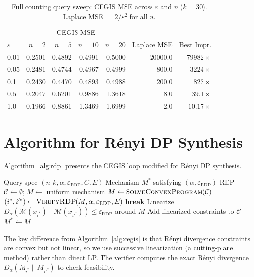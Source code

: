 \documentclass[11pt,a4paper]{article}
\newcommand{\eps}{\varepsilon}
\newcommand{\cM}{\mathcal{M}}
\newcommand{\cC}{\mathcal{C}}
\begin{document}
\begin{table}[h]
\centering
\caption{Full counting query sweep: CEGIS MSE across $\eps$ and $n$ ($k = 30$).
  Laplace MSE $= 2/\eps^2$ for all $n$.}
\label{tab:fullsweep}
\small
\begin{tabular}{@{}lrrrrrr@{}}
\toprule
& \multicolumn{4}{c}{CEGIS MSE} & & \\
$\eps$ & $n=2$ & $n=5$ & $n=10$ & $n=20$ & Laplace MSE & Best Impr. \\
\midrule
0.01 & 0.2501 & 0.4892 & 0.4991 & 0.5000 & 20000.0 & $79982\times$ \\
0.05 & 0.2481 & 0.4744 & 0.4967 & 0.4999 & 800.0 & $3224\times$ \\
0.1  & 0.2430 & 0.4470 & 0.4893 & 0.4988 & 200.0 & $823\times$ \\
0.5  & 0.2047 & 0.6201 & 0.9886 & 1.3618 & 8.0 & $39.1\times$ \\
1.0  & 0.1966 & 0.8861 & 1.3469 & 1.6999 & 2.0 & $10.17\times$ \\
\bottomrule
\end{tabular}
\end{table}

\section{Algorithm for R\'enyi DP Synthesis}
\label{app:rdp}

Algorithm~\ref{alg:rdp} presents the CEGIS loop modified for R\'enyi DP synthesis.

\begin{algorithm}[h]
\caption{CEGIS-based R\'enyi DP Mechanism Synthesis}
\label{alg:rdp}
\begin{algorithmic}[1]
\Require Query spec $(n, k, \alpha, \eps_{\text{RDP}}, C, E)$
\Ensure Mechanism $M^*$ satisfying $(\alpha, \eps_{\text{RDP}})$-RDP
\State $\cC \gets \emptyset$; $M \gets$ uniform mechanism
\Repeat
  \State $M \gets \textsc{SolveConvexProgram}(\cC)$ 
  \State $(i^*, i'^*) \gets \textsc{VerifyRDP}(M, \alpha, \eps_{\text{RDP}}, E)$
    \State \textbf{break}
  \EndIf
  \State Linearize $D_\alpha(\cM(x_{i^*}) \| \cM(x_{i'^*})) \le \eps_{\text{RDP}}$ around $M$
  \State Add linearized constraints to $\cC$
\State \Return $M^* \gets M$
\end{algorithmic}
\end{algorithm}

The key difference from Algorithm~\ref{alg:cegis} is that R\'enyi divergence
constraints are convex but not linear, so we use successive linearization
(a cutting-plane method) rather than direct LP.  The verifier computes the exact
R\'enyi divergence $D_\alpha(M_{i^*} \| M_{i'^*})$ to check feasibility.
\end{document}
